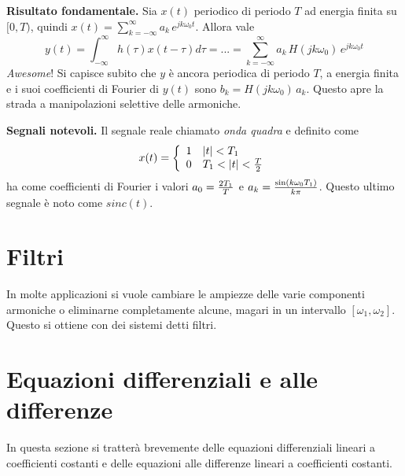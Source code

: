 \documentclass[a4paper,portrait,12pt]{article}
\theoremstyle{definition}
\begin{document}
\textbf{Risultato fondamentale.} Sia $x(t)$ periodico di periodo $T$ ad energia finita su $[0,T)$, quindi
$x(t) = \sum_{k = -\infty}^{\infty}a_k\,e^{jk\omega_0t}$. Allora vale
\begin{equation}
y(t) = \int_{-\infty}^{\infty}h(\tau)x(t-\tau)d\tau = ... = \sum_{k = -\infty}^{\infty}a_k\,H(jk\omega_0)
\,e^{jk\omega_0t}
\end{equation}
\textit{Awesome}! Si capisce subito che $y$ è ancora periodica di periodo $T$, a energia finita e i suoi 
coefficienti di Fourier di $y(t)$ sono $b_k=H(jk\omega_0)\,a_k$. Questo apre la strada a manipolazioni 
selettive delle armoniche.
\bigskip

\textbf{Segnali notevoli.} Il segnale reale chiamato \textit{onda quadra} e definito come 
\[
x(t) = \left\{ 
	\begin{array}{ll}
	1 & \left|t\right| < T_1\\
	0 & T_1 < \left|t\right| < {T\over 2}\\
	\end{array} 
	\right.
\]
ha come coefficienti di Fourier i valori $a_0 = {2T_1 \over T}$ e $a_k = {\sin(k\omega_0 T_1) \over k \pi}$.
Questo ultimo segnale è noto come $sinc(t)$.
\bigskip


\section{Filtri}
In molte applicazioni si vuole cambiare le ampiezze delle varie componenti armoniche o eliminarne completamente
alcune, magari in un intervallo $[\omega_1,\omega_2]$. Questo si ottiene con dei sistemi detti filtri.
\bigskip


\section{Equazioni differenziali e alle differenze}

In questa sezione si tratterà brevemente delle equazioni differenziali lineari a coefficienti costanti e delle
equazioni alle differenze lineari a coefficienti costanti.
\bigskip
\end{document}
